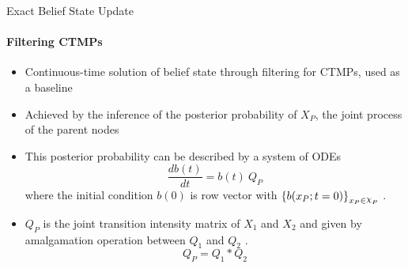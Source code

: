 \documentclass[
	english,%
	aspectratio=169,%
	color={accentcolor=3b},
	logo=true,%
	colorframetitle=false,%
	]{tudabeamer}
\DeclareRobustCommand{\rchi}{{\mathpalette\irchi\relax}}
\newcommand{\irchi}[2]{\raisebox{\depth}{$#1\chi$}}
\begin{document}
\begin{frame}{Exact Belief State Update}
\framesubtitle{Filtering CTMPs}
\begin{itemize}
	\item Continuous-time solution of belief state through filtering for CTMPs, used as a baseline
	\item Achieved by the inference of the posterior probability of $ X_P $, the joint process of the parent nodes
	\item This posterior probability can be described by a system of ODEs
	\begin{equation}
	\frac{db(t)}{dt} = b(t)\ Q_P
	\end{equation}
	where the initial condition $ b(0) $ is row vector with $ \left\lbrace b(x_P;t=0)\right\rbrace_{x_P \in \rchi_P} $ \cite{huang_pauleve_zechner_unger_hansen_koeppl_2016}.
	\item $ Q_P $ is the joint transition intensity matrix of $ X_{1} $ and $ X_{2} $ and given by amalgamation operation between $ Q_{1} $ and  $ Q_{2} $ \cite{Nodelman1995}.
	\begin{equation}
	Q_P = Q_{1} * Q_{2}
	\end{equation}
\end{itemize}
\end{frame}
\end{document}
